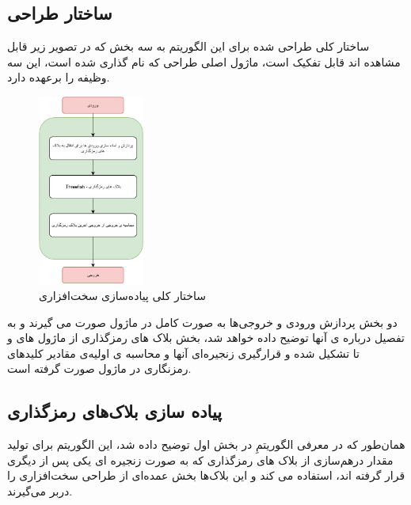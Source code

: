 \subsection{
	ساختار طراحی
}
ساختار کلی طراحی شده برای این الگوریتم به سه بخش که در تصویر زیر قابل مشاهده اند قابل تفکیک است، ماژول اصلی طراحی که 
نام گذاری شده است، این سه وظیفه را بر‌عهده دارد.
\vspace{-0.2cm}
\begin{figure}[H]
	\centering
	\includegraphics[width=3.5cm]{Images/VerilogDocumentation/skein_functionality.pdf}	
	\caption{ساختار کلی پیاده‌سازی سخت‌افزاری}
\end{figure}
دو بخش پردازش ورودی و خروجی‌ها به صورت کامل در ماژول 
صورت می گیرند و به تفصیل درباره ی آنها توضیح داده خواهد شد، بخش بلاک های رمزگذاری از ماژول های 
و 
تا 
تشکیل شده و قرارگیری زنجیره‌ای آنها و محاسبه ی اولیه‌ی مقادیر کلید‌های رمزنگاری در ماژول 
صورت گرفته است.

\subsection{
	پیاده سازی بلاک‌های رمزگذاری
}
همان‌طور که در معرفی الگوریتمِ
در بخش اول توضیح داده شد، این الگوریتم برای تولید مقدار درهم‌سازی از بلاک های رمزگذاری که به صورت زنجیره ای یکی پس از دیگری قرار گرفته اند، استفاده می کند و این بلاک‌ها بخش عمده‌ای از طراحی سخت‌افزاری را دربر می‌گیرند. 

